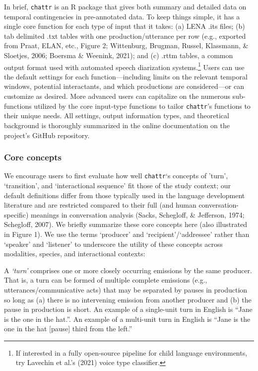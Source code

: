 \documentclass[10pt, letterpaper]{article}
\begin{document}
In brief, \texttt{chattr} is an R package that gives both summary and
detailed data on temporal contingencies in pre-annotated data. To keep
things simple, it has a single core function for each type of input that
it takes: (a) LENA .its files; (b) tab delimited .txt tables with one
production/utterance per row (e.g., exported from Praat, ELAN, etc.,
Figure 2; Wittenburg, Brugman, Russel, Klassmann, \& Sloetjes, 2006;
Boersma \& Weenink, 2021); and (c) .rttm tables, a common output format
used with automated speech diarization systems.\footnote{If interested
  in a fully open-source pipeline for child language environments, try
  Lavechin et al.'s (2021) voice type classifier.} Users can use the
default settings for each function---including limits on the relevant
temporal windows, potential interactants, and which productions are
considered---or can customize as desired. More advanced users can
capitalize on the numerous sub-functions utilized by the core input-type
functions to tailor \texttt{chattr}'s functions to their unique needs.
All settings, output information types, and theoretical background is
thoroughly summarized in the online documentation on the project's
GitHub repository.

\hypertarget{core-concepts}{%
\subsubsection{Core concepts}\label{core-concepts}}

We encourage users to first evaluate how well \texttt{chattr}`s concepts
of 'turn', `transition', and `interactional sequence' fit those of the
study context; our default definitions differ from those typically used
in the language development literature and are restricted compared to
their full (and human conversation-specific) meanings in conversation
analysis (Sacks, Schegloff, \& Jefferson, 1974; Schegloff, 2007). We
briefly summarize these core concepts here (also illustrated in Figure
1). We use the terms `producer' and `recipient'/`addressee' rather than
`speaker' and `listener' to underscore the utility of these concepts
across modalities, species, and interactional contexts:

A \emph{`turn'} comprises one or more closely occurring emissions by the
same producer. That is, a turn can be formed of multiple complete
emissions (e.g., utterances/communicative acts) that may be separated by
pauses in production so long as (a) there is no intervening emission
from another producer and (b) the pause in production is short. An
example of a single-unit turn in English is ``Jane is the one in the
hat.''. An example of a multi-unit turn in English is ``Jane is the one
in the hat {[}pause{]} third from the left.''
\end{document}

